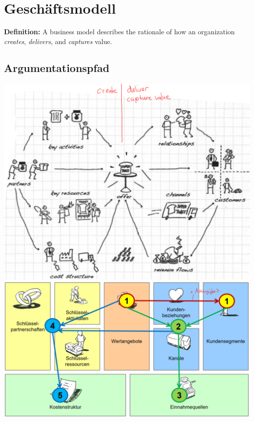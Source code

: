 
\section{Geschäftsmodell}
\textbf{Definition:} A business model describes the rationale of how an organization \textit{creates}, \textit{delivers}, and \textit{captures} value. 

\subsection{Argumentationspfad}
\begin{multicols}{2}
	\includegraphics[width=1\linewidth]{images/Geschaeftsmodell}
	\includegraphics[width=1\linewidth]{images/Argumentationspfad}
\end{multicols}


